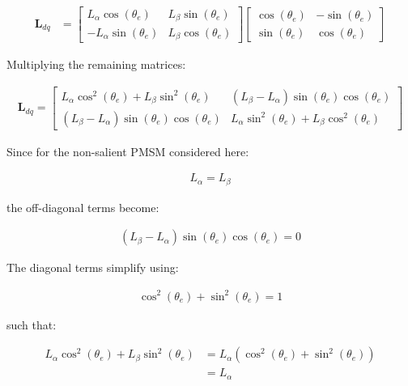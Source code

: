 \documentclass{article}
\begin{document}
\begin{align}
    \mathbf{L}_{dq}
    &=
    \begin{bmatrix}
        L_\alpha \cos(\theta_e) & L_\beta \sin(\theta_e) \\
        -L_\alpha \sin(\theta_e) & L_\beta \cos(\theta_e)
    \end{bmatrix}
    \begin{bmatrix}
        \cos(\theta_e) & -\sin(\theta_e) \\
        \sin(\theta_e) & \cos(\theta_e)
    \end{bmatrix}
\end{align}

Multiplying the remaining matrices:

\begin{align}
    \mathbf{L}_{dq}
    =
    \begin{bmatrix}
        L_\alpha \cos^2(\theta_e)
        + L_\beta \sin^2(\theta_e)
        &
        (L_\beta-L_\alpha)
        \sin(\theta_e)\cos(\theta_e)
        \\[6pt]
        (L_\beta-L_\alpha)
        \sin(\theta_e)\cos(\theta_e)
        &
        L_\alpha \sin^2(\theta_e)
        + L_\beta \cos^2(\theta_e)
    \end{bmatrix}
\end{align}

Since for the non-salient PMSM considered here:

\begin{align}
    L_\alpha = L_\beta
\end{align}

the off-diagonal terms become:

\begin{align}
    (L_\beta-L_\alpha)
    \sin(\theta_e)\cos(\theta_e)
    = 0
\end{align}

The diagonal terms simplify using:

\begin{align}
    \cos^2(\theta_e)+\sin^2(\theta_e)=1
\end{align}

such that:

\begin{align}
    L_\alpha\cos^2(\theta_e)
    +L_\beta\sin^2(\theta_e)
    &=
    L_\alpha
    \left(
        \cos^2(\theta_e)+\sin^2(\theta_e)
    \right)
    \\
    &=L_\alpha
\end{align}
\end{document}

